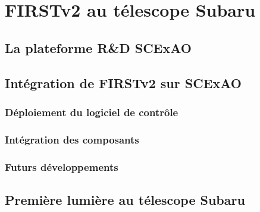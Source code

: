 \chapter{FIRSTv2 au télescope Subaru}
\label{sec:FIRSTv2Subaru}
\setcounter{figure}{0}
\setcounter{table}{0}
\setcounter{equation}{0}

\minitoc

\clearpage
\section{La plateforme R\&D SCExAO}

\section{Intégration de FIRSTv2 sur SCExAO}

\subsection{Déploiement du logiciel de contrôle}

\subsection{Intégration des composants}

\subsection{Futurs développements}


\section{Première lumière au télescope Subaru}


